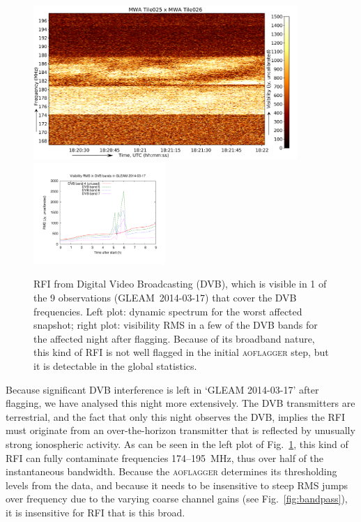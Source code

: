 \documentclass{pasa}
\begin{document}
\noindent\begin{figure}%
\begin{center}\hspace*{-0.2cm}\includegraphics[width=10cm]{img/dvb_example}\includegraphics[width=5cm]{img/2014-03-17-dvb-stddevs}
\end{center}
\caption{RFI from Digital Video Broadcasting (DVB), which is visible in 1 of the 9 observations (GLEAM~2014-03-17) that cover the DVB frequencies. Left plot: dynamic spectrum for the worst affected snapshot; right plot: visibility RMS in a few of the DVB bands for the affected night after flagging. Because of its broadband nature, this kind of RFI is not well flagged in the initial \textsc{aoflagger} step, but it is detectable in the global statistics. }
\label{fig:dvb}
\end{figure}

Because significant DVB interference is left in `GLEAM 2014-03-17' after flagging, we have analysed this night more extensively. The DVB transmitters are terrestrial, and the fact that only this night observes the DVB, implies the RFI must originate from an over-the-horizon transmitter that is reflected by unusually strong ionospheric activity. As can be seen in the left plot of Fig.~\ref{fig:dvb}, this kind of RFI can fully contaminate frequencies 174--195~MHz, thus over half of the instantaneous bandwidth. Because the \textsc{aoflagger} determines its thresholding levels from the data, and because it needs to be insensitive to steep RMS jumps over frequency due to the varying coarse channel gains (see Fig.~\ref{fig:bandpass}), it is insensitive for RFI that is this broad.
\end{document}
